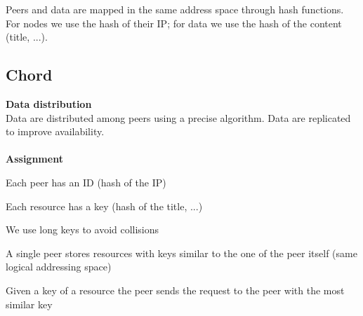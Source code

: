 \documentclass[paper=a4, fontsize=11pt]{scrartcl} %
\numberwithin{equation}{section} %
\numberwithin{figure}{section} %
\numberwithin{table}{section} %
\begin{document}
Peers and data are mapped in the same address space through hash functions. For nodes we use the hash of their IP; for data we use the hash of the content (title, ...).

\subsection*{Chord}
\textbf{Data distribution}\\
Data are distributed among peers using a precise algorithm. Data are replicated to improve availability.\\ ~ \\
\textbf{Assignment}
\begin{compactitem}
\item Each peer has an ID (hash of the IP)
\item Each resource has a key (hash of the title, ...)
\item We use long keys to avoid collisions
\item A single peer stores resources with keys similar to the one of the peer itself (same logical addressing space)
\item Given a key of a resource the peer sends the request to the peer with the most similar key
\end{compactitem}
\end{document}
